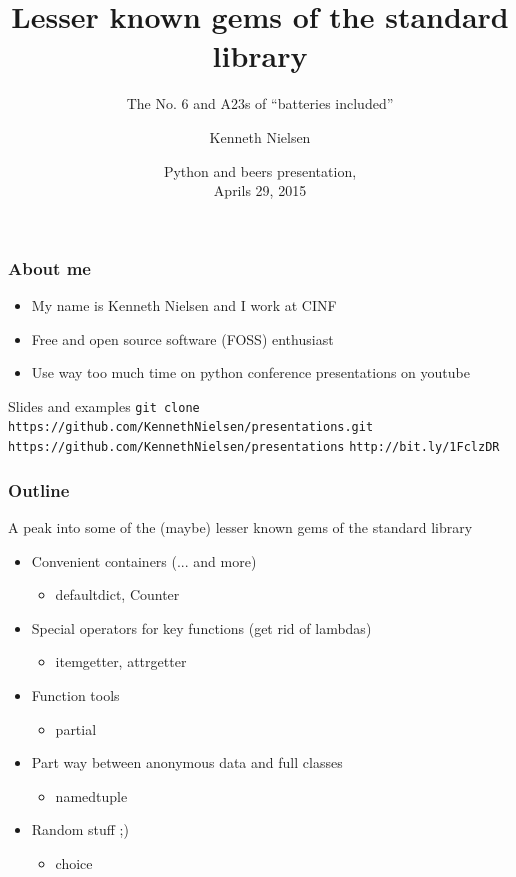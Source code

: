 \documentclass{beamer}
\title{Lesser known gems of the standard library}
\subtitle{The No. 6 and A23s of ``batteries included''}
\author{Kenneth Nielsen\inst{1}}
\institute
{
  \inst{1}%
  Center for Individual Nanoparticle Functionality (CINF)\\
  Institute of Physics\\
  Technical University of Denmark (DTU)
}
\date{
  Python and beers presentation,\\
  Aprils 29, 2015}
\begin{document}
\frame{\titlepage}

\begin{frame}
  \frametitle{About me}
  \begin{itemize}
    \item My name is Kenneth Nielsen and I work at CINF
    \item Free and open source software (FOSS) enthusiast
    \item Use way too much time on python conference presentations on
      youtube
  \end{itemize}
  \begin{block}{Slides and examples}
    \center
    \footnotesize
    \texttt{git clone https://github.com/KennethNielsen/presentations.git}\newline
    \newline
    \texttt{https://github.com/KennethNielsen/presentations}
    \texttt{http://bit.ly/1FclzDR}
  \end{block}
\end{frame}

\begin{frame}
  \frametitle{Outline}

  A peak into some of the (maybe) lesser known gems of the standard library
  \begin{itemize}
  \item Convenient containers (... and more)
    \begin{itemize}
    \item defaultdict, Counter
    \end{itemize}
  \item Special operators for key functions (get rid of lambdas)
    \begin{itemize}
    \item itemgetter, attrgetter
    \end{itemize}
  \item Function tools
    \begin{itemize}
    \item partial
    \end{itemize}
  \item Part way between anonymous data and full classes
    \begin{itemize}
    \item namedtuple
    \end{itemize}
  \item Random stuff ;)
    \begin{itemize}
    \item choice
    \end{itemize}
  \end{itemize}
\end{frame}
\end{document}
